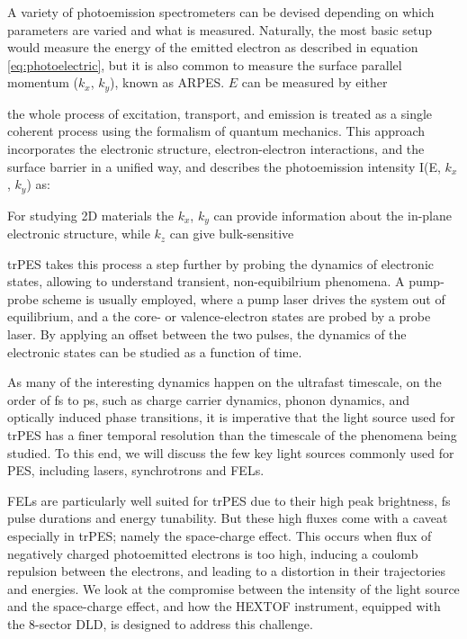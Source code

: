 A variety of photoemission spectrometers can be devised depending on which parameters are varied and what is measured. Naturally, the most basic setup would measure the energy of the emitted electron as described in equation \ref{eq:photoelectric}, but it is also common to measure the surface parallel momentum ($k_x$, $k_y$), known as \gls{ARPES}. $E$ can be measured by either 




the whole process of excitation, transport, and emission is treated as a single coherent process using the formalism of quantum mechanics. This approach incorporates the electronic structure, electron-electron interactions, and the surface barrier in a unified way, and describes the photoemission intensity  I(E, $k_x$, $k_y$)  as:


For studying 2D materials the $k_x$, $k_y$ can provide information about the in-plane electronic structure, while $k_z$ can give bulk-sensitive 

\gls{trPES} takes this process a step further by probing the dynamics of electronic states, allowing to understand transient, non-equibilrium phenomena. A pump-probe scheme is usually employed, where a pump laser drives the system out of equilibrium, and a the core- or valence-electron states are probed by a probe laser. By applying an offset between the two pulses, the dynamics of the electronic states can be studied as a function of time.

As many of the interesting dynamics happen on the ultrafast timescale, on the order of \unit{fs} to \unit{ps}, such as charge carrier dynamics, phonon dynamics, and optically induced phase transitions, it is imperative that the light source used for \gls{trPES} has a finer temporal resolution than the timescale of the phenomena being studied. To this end, we will discuss the few key light sources commonly used for \gls{PES}, including lasers, synchrotrons and \glspl{FEL}.

\Glspl{FEL} are particularly well suited for \gls{trPES} due to their high peak brightness, \unit{fs} pulse durations and energy tunability. But these high fluxes come with a caveat especially in \gls{trPES}; namely the space-charge effect. This occurs when flux of negatively charged photoemitted electrons is too high, inducing a coulomb repulsion between the electrons, and leading to a distortion in their trajectories and energies. We look at the compromise between the intensity of the light source and the space-charge effect, and how the \gls{HEXTOF} instrument, equipped with the \num{8}-sector \gls{DLD}, is designed to address this challenge.

